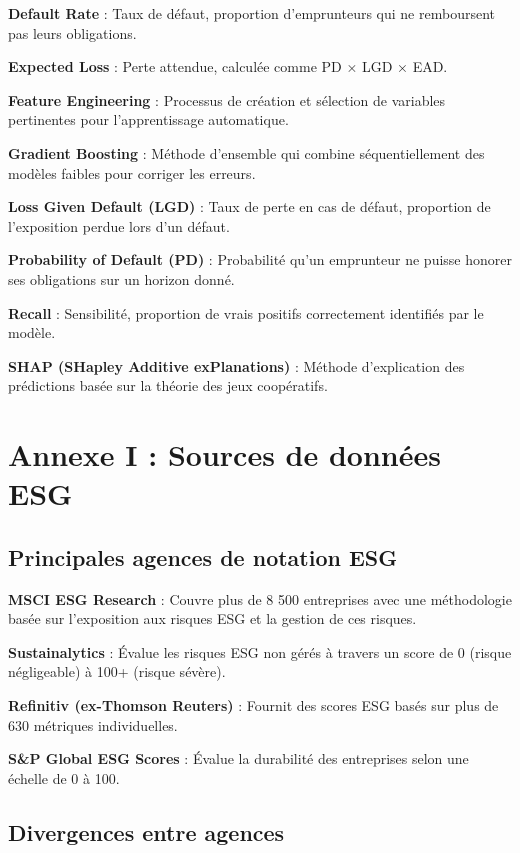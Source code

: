 \textbf{Default Rate} : Taux de défaut, proportion d'emprunteurs qui ne remboursent pas leurs obligations.

\textbf{Expected Loss} : Perte attendue, calculée comme PD × LGD × EAD.

\textbf{Feature Engineering} : Processus de création et sélection de variables pertinentes pour l'apprentissage automatique.

\textbf{Gradient Boosting} : Méthode d'ensemble qui combine séquentiellement des modèles faibles pour corriger les erreurs.

\textbf{Loss Given Default (LGD)} : Taux de perte en cas de défaut, proportion de l'exposition perdue lors d'un défaut.

\textbf{Probability of Default (PD)} : Probabilité qu'un emprunteur ne puisse honorer ses obligations sur un horizon donné.

\textbf{Recall} : Sensibilité, proportion de vrais positifs correctement identifiés par le modèle.

\textbf{SHAP (SHapley Additive exPlanations)} : Méthode d'explication des prédictions basée sur la théorie des jeux coopératifs.

\section{Annexe I : Sources de données ESG}

\subsection{Principales agences de notation ESG}

\textbf{MSCI ESG Research} : Couvre plus de 8 500 entreprises avec une méthodologie basée sur l'exposition aux risques ESG et la gestion de ces risques.

\textbf{Sustainalytics} : Évalue les risques ESG non gérés à travers un score de 0 (risque négligeable) à 100+ (risque sévère).

\textbf{Refinitiv (ex-Thomson Reuters)} : Fournit des scores ESG basés sur plus de 630 métriques individuelles.

\textbf{S\&P Global ESG Scores} : Évalue la durabilité des entreprises selon une échelle de 0 à 100.

\subsection{Divergences entre agences}

